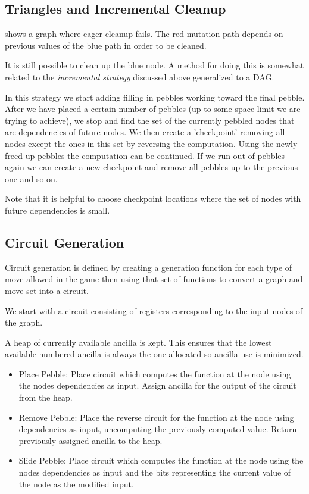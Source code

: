 \subsection{Triangles and Incremental Cleanup}

 shows a graph where eager cleanup fails. The red mutation
path depends on previous values of the blue path in order to be cleaned.

It is still possible to clean up the blue node. A method for doing this is
somewhat related to the \emph{incremental strategy} discussed above generalized
to a DAG.

In this strategy we start adding filling in pebbles working toward the final
pebble. After we have placed a certain number of pebbles (up to some space
limit we are trying to achieve), we stop and find the set of the currently
pebbled nodes that are dependencies of future nodes. We then create a
'checkpoint' removing all nodes except the ones in this set by reversing the
computation.  Using the newly freed up pebbles the computation can be
continued.  If we run out of pebbles again we can create a new checkpoint and
remove all pebbles up to the previous one and so on.

Note that it is helpful to choose checkpoint locations where the set of nodes
with future dependencies is small.

\subsection{Circuit Generation}
Circuit generation is defined by creating a generation function for each
type of move allowed in the game then using that set of functions to convert a
graph and move set into a circuit.

We start with a circuit consisting of registers corresponding to the input nodes
of the graph.

A heap of currently available ancilla is kept. This ensures that the
lowest available numbered ancilla is always the one allocated so ancilla use is
minimized.

\begin{itemize}
    \item Place Pebble: Place circuit which computes the function at the node
      using the nodes dependencies as input. Assign ancilla for the output of
      the circuit from the heap.
    \item Remove Pebble: Place the reverse circuit for the function at the node
      using dependencies as input, uncomputing the previously computed value.
      Return previously assigned ancilla to the heap.
    \item Slide Pebble: Place circuit which computes the function at the node
      using the nodes dependencies as input and the bits representing the
      current value of the node as the modified input.
\end{itemize}

